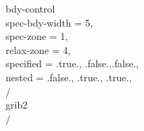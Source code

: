 \documentclass[a4paper,12pt]{article}
\numberwithin{equation}{section} %
\begin{document}
 bdy-control\\
 spec-bdy-width                      = 5,\\
 spec-zone                           = 1,\\
 relax-zone                          = 4,\\
 specified                           = .true., .false.,.false.,\\
 nested                              = .false., .true., .true.,\\
 /\\

 grib2\\
 /\\

\newpage





\end{document}
